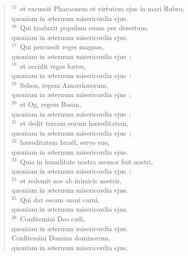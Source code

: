 \begin{flushleft}
\begin{verse}
${}^{15}$~et excussit Pharaonem et virtutem ejus in mari Rubro,\\ quoniam in \ae ternum misericordia ejus.\\
${}^{16}$~Qui traduxit populum suum per desertum,\\ quoniam in \ae ternum misericordia ejus.\\
${}^{17}$~Qui percussit reges magnos,\\ quoniam in \ae ternum misericordia ejus~;\\
${}^{18}$~et occidit reges fortes,\\ quoniam in \ae ternum misericordia ejus~:\\
${}^{19}$~Sehon, regem Amorrh\ae orum,\\ quoniam in \ae ternum misericordia ejus~;\\
${}^{20}$~et Og, regem Basan,\\ quoniam in \ae ternum misericordia ejus~:\\
${}^{21}$~et dedit terram eorum h\ae reditatem,\\ quoniam in \ae ternum misericordia ejus~;\\
${}^{22}$~h\ae reditatem Isra\"el, servo suo,\\ quoniam in \ae ternum misericordia ejus.\\
${}^{23}$~Quia in humilitate nostra memor fuit nostri,\\ quoniam in \ae ternum misericordia ejus~;\\
${}^{24}$~et redemit nos ab inimicis nostris,\\ quoniam in \ae ternum misericordia ejus.\\
${}^{25}$~Qui dat escam omni carni,\\ quoniam in \ae ternum misericordia ejus.\\
${}^{26}$~Confitemini Deo c\ae li,\\ quoniam in \ae ternum misericordia ejus.\\ Confitemini Domino dominorum,\\ quoniam in \ae ternum misericordia ejus.\end{verse}\end{flushleft}


